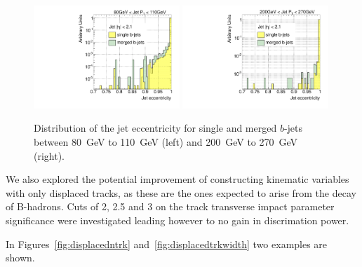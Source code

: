 \begin{figure}[tp]
\centering
\includegraphics[width=0.49\textwidth]{FIGS/VarsSingleMerged/JetEcc080.pdf}
\includegraphics[width=0.49\textwidth]{FIGS/VarsSingleMerged/JetEcc200.pdf}
\caption{Distribution of the jet eccentricity for single and merged $b$-jets between 80~GeV to 110~GeV (left) and 200~GeV to 270~GeV (right).}
\label{fig:jeteccsinglemerged}
\end{figure}




We also explored the potential improvement of constructing kinematic variables with only displaced tracks, as these are the ones expected to arise from the decay of B-hadrons. Cuts of 2, 2.5 and 3 on the track transverse impact parameter significance were investigated leading however to no gain in discrimation power.

 In Figures~\ref{fig:displacedntrk} and~\ref{fig:displacedtrkwidth} two examples are shown.


